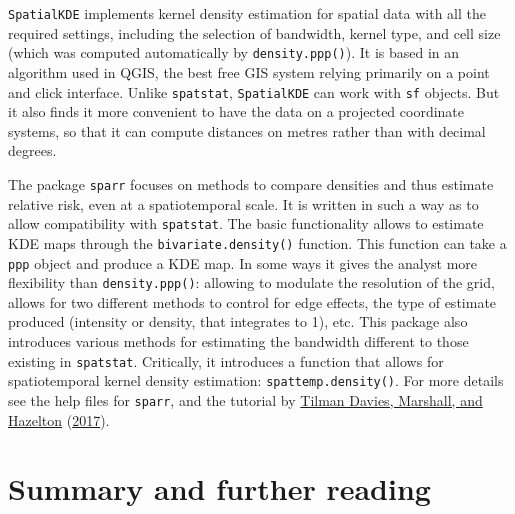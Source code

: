 \documentclass[
  krantz2]{krantz}
\begin{document}
\texttt{SpatialKDE} implements kernel density estimation for spatial data with all the required settings, including the selection of bandwidth, kernel type, and cell size (which was computed automatically by \texttt{density.ppp()}). It is based in an algorithm used in QGIS, the best free GIS system relying primarily on a point and click interface. Unlike \texttt{spatstat}, \texttt{SpatialKDE} can work with \texttt{sf} objects. But it also finds it more convenient to have the data on a projected coordinate systems, so that it can compute distances on metres rather than with decimal degrees.

The package \texttt{sparr} focuses on methods to compare densities and thus estimate relative risk, even at a spatiotemporal scale. It is written in such a way as to allow compatibility with \texttt{spatstat}. The basic functionality allows to estimate KDE maps through the \texttt{bivariate.density()} function. This function can take a \texttt{ppp} object and produce a KDE map. In some ways it gives the analyst more flexibility than \texttt{density.ppp()}: allowing to modulate the resolution of the grid, allows for two different methods to control for edge effects, the type of estimate produced (intensity or density, that integrates to 1), etc. This package also introduces various methods for estimating the bandwidth different to those existing in \texttt{spatstat}. Critically, it introduces a function that allows for spatiotemporal kernel density estimation: \texttt{spattemp.density()}. For more details see the help files for \texttt{sparr}, and the tutorial by \protect\hyperlink{ref-Davies_2017}{Tilman Davies, Marshall, and Hazelton} (\protect\hyperlink{ref-Davies_2017}{2017}).

\hypertarget{summary-and-further-reading-6}{%
\section{Summary and further reading}\label{summary-and-further-reading-6}}
\end{document}
